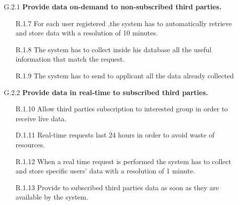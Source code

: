 \begin{enumerate}
\begin{enumerate}
	\item [G.2.1] \textbf{Provide data on-demand to non-subscribed third parties.}
		\begin{enumerate} 
		\item [R.1.7] For each user registered ,the system has to automatically retrieve and store data with a resolution of 10 minutes.	
		\item [R.1.8] The system has to collect inside his database all the useful information that match the request.
		\item [R.1.9] The system has to send to applicant all the data already collected
    	\end{enumerate}	
    	
    \item [G.2.2] \textbf{Provide data in real-time to subscribed third parties.}
		\begin{enumerate}
    	\item [R.1.10] Allow third parties subscription to interested group in order to receive live data.
    	\item [D.1.11] Real-time requests last 24 hours in order to avoid waste of resources.
    	\item [R.1.12] When a real time request is performed the system has to collect and store specific users' data with a resolution of 1 minute.
    	\item [R.1.13] Provide to subscribed third parties data as soon as they are available by the system.
    	\end{enumerate}
    		
    	
    	
  	
			
		
		
			
	\end{enumerate}

\end{enumerate}




